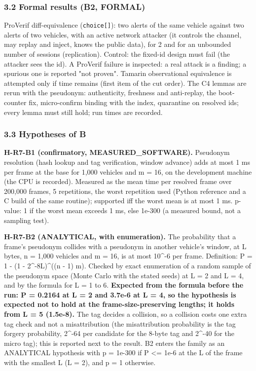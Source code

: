 \subsubsection*{3.2 Formal results (B2, FORMAL)}

ProVerif diff-equivalence (\texttt{choice[]}): two alerts of the same vehicle against two alerts of two vehicles, with an active network attacker (it controls the channel, may replay and inject, knows the public data), for 2 and for an unbounded number of sessions (replication). Control: the fixed-id design must fail (the attacker sees the id). A ProVerif failure is inspected: a real attack is a finding; a spurious one is reported "not proven". Tamarin observational equivalence is attempted only if time remains (first item of the cut order). The C4 lemmas are rerun with the pseudonym: authenticity, freshness and anti-replay, the boot-counter fix, micro-confirm binding with the index, quarantine on resolved ids; every lemma must still hold; run times are recorded.

\subsubsection*{3.3 Hypotheses of B}

\textbf{H-R7-B1 (confirmatory, MEASURED\_SOFTWARE).} Pseudonym resolution (hash lookup and tag verification, window advance) adds at most 1 ms per frame at the base for 1,000 vehicles and m = 16, on the development machine (the CPU is recorded). Measured as the mean time per resolved frame over 200,000 frames, 5 repetitions, the worst repetition used (Python reference and a C build of the same routine); supported iff the worst mean is at most 1 ms. p-value: 1 if the worst mean exceeds 1 ms, else 1e-300 (a measured bound, not a sampling test).

\textbf{H-R7-B2 (ANALYTICAL, with enumeration).} The probability that a frame's pseudonym collides with a pseudonym in another vehicle's window, at L bytes, n = 1,000 vehicles and m = 16, is at most 10\textasciicircum{}-6 per frame. Definition: P = 1 - (1 - 2\textasciicircum{}-8L)\textasciicircum{}((n - 1) m). Checked by exact enumeration of a random sample of the pseudonym space (Monte Carlo with the stated seeds) at L = 2 and L = 4, and by the formula for L = 1 to 6. \textbf{Expected from the formula before the run: P = 0.2164 at L = 2 and 3.7e-6 at L = 4, so the hypothesis is expected not to hold at the frame-size-preserving lengths; it holds from L = 5 (1.5e-8).} The tag decides a collision, so a collision costs one extra tag check and not a misattribution (the misattribution probability is the tag forgery probability, 2\textasciicircum{}-64 per candidate for the 8-byte tag and 2\textasciicircum{}-40 for the micro tag); this is reported next to the result. B2 enters the family as an ANALYTICAL hypothesis with p = 1e-300 if P <= 1e-6 at the L of the frame with the smallest L (L = 2), and p = 1 otherwise.

